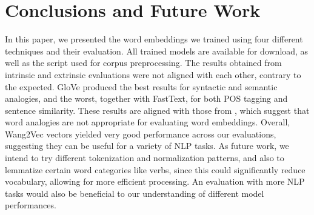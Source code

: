 \section{Conclusions and Future Work}

In this paper, we presented the word embeddings we trained using four different techniques and their evaluation.
All trained models are available for download, as well as the script used for corpus preprocessing. The results obtained from intrinsic and extrinsic evaluations were not aligned with each other, contrary to the expected. GloVe produced the best results for syntactic and semantic analogies, and the worst, together with FastText, for both POS tagging and sentence similarity. These results are aligned with those from \cite{repeval:16}, which suggest that word analogies are not appropriate for evaluating word embeddings. Overall, Wang2Vec vectors yielded very good performance across our evaluations, suggesting they can be useful for a variety of NLP tasks.
As future work, we intend to try different tokenization and normalization patterns, and also to lemmatize certain word categories like verbs, since this could significantly reduce vocabulary, allowing for more efficient processing. An evaluation with more NLP tasks would also be beneficial to our understanding of different model performances.


